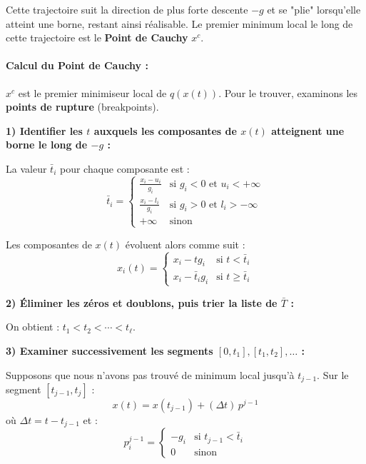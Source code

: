 Cette trajectoire suit la direction de plus forte descente $-g$ et se "plie" lorsqu'elle atteint une borne, restant ainsi réalisable. Le premier minimum local le long de cette trajectoire est le \textbf{Point de Cauchy} $x^c$.

\paragraph{Calcul du Point de Cauchy :}
$x^c$ est le premier minimiseur local de $q(x(t))$. Pour le trouver, examinons les \textbf{points de rupture} (breakpoints).

\textbf{1) Identifier les $t$ auxquels les composantes de $x(t)$ atteignent une borne le long de $-g$ :}

La valeur $\bar{t}_i$ pour chaque composante est :
\begin{equation}
    \bar{t}_i = \begin{cases}
        \displaystyle\frac{x_i - u_i}{g_i} & \text{si } g_i < 0 \text{ et } u_i < +\infty \\[10pt]
        \displaystyle\frac{x_i - l_i}{g_i} & \text{si } g_i > 0 \text{ et } l_i > -\infty \\[10pt]
        +\infty & \text{sinon}
    \end{cases}
\end{equation}

Les composantes de $x(t)$ évoluent alors comme suit :
\begin{equation}
    x_i(t) = \begin{cases}
        x_i - t g_i & \text{si } t < \bar{t}_i \\
        x_i - \bar{t}_i g_i & \text{si } t \ge \bar{t}_i
    \end{cases}
\end{equation}

\textbf{2) Éliminer les zéros et doublons, puis trier la liste de $\bar{T}$ :}

On obtient : $t_1 < t_2 < \cdots < t_\ell$.

\textbf{3) Examiner successivement les segments $[0, t_1], [t_1, t_2], \ldots$ :}

Supposons que nous n'avons pas trouvé de minimum local jusqu'à $t_{j-1}$. Sur le segment $[t_{j-1}, t_j]$ :
\begin{equation}
    x(t) = x(t_{j-1}) + (\Delta t) \, p^{j-1}
\end{equation}
où $\Delta t = t - t_{j-1}$ et :
\begin{equation}
    p_i^{j-1} = \begin{cases}
        -g_i & \text{si } t_{j-1} < \bar{t}_i \\
        0 & \text{sinon}
    \end{cases}
\end{equation}

